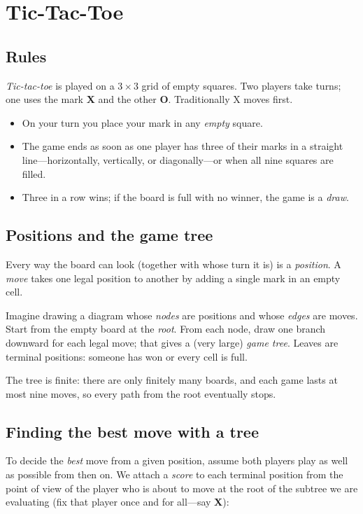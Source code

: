 \chapter{Tic-Tac-Toe}

\section{Rules}
\emph{Tic-tac-toe} is played on a \(3\times 3\) grid of empty squares. Two
players take turns; one uses the mark \textbf{X} and the other \textbf{O}.
Traditionally X moves first.

\begin{itemize}
  \item On your turn you place your mark in any \emph{empty} square.
  \item The game ends as soon as one player has three of their marks in a
  straight line---horizontally, vertically, or diagonally---or when all nine
  squares are filled.
  \item Three in a row wins; if the board is full with no winner, the game is a
  \emph{draw}.
\end{itemize}

\section{Positions and the game tree}
Every way the board can look (together with whose turn it is) is a
\emph{position}. A \emph{move} takes one legal position to another by adding a
single mark in an empty cell.

Imagine drawing a diagram whose \emph{nodes} are positions and whose
\emph{edges} are moves. Start from the empty board at the \emph{root}. From each
node, draw one branch downward for each legal move; that gives a (very large)
\emph{game tree}. Leaves are terminal positions: someone has won or every cell
is full.

The tree is finite: there are only finitely many boards, and each game lasts at
most nine moves, so every path from the root eventually stops.

\section{Finding the best move with a tree}
To decide the \emph{best} move from a given position, assume both players play
as well as possible from then on. We attach a \emph{score} to each terminal
position from the point of view of the player who is about to move at the root
of the subtree we are evaluating (fix that player once and for all---say
\textbf{X}):

